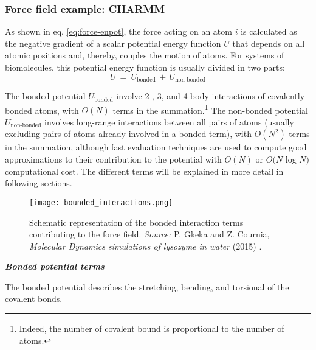 \subsubsection{Force field example: CHARMM}

As shown in eq. \eqref{eq:force-enpot}, the force acting on an atom $i$ is calculated as the negative gradient of a scalar potential energy function $U$ that depends on all atomic positions and, thereby, couples the motion of atoms. For systems of biomolecules, this potential energy function is usually divided in two parts:
\begin{equation}\label{eq:forcefield-PotEnergy}
U \: = \: U_{\text{bonded}} \, + \, U_{\text{non-bonded}} 
\end{equation}

The bonded potential $U_{\text{bonded}}$ involve 2 , 3, and 4-body interactions of covalently bonded atoms, with $O(N)$ terms in the summation.\footnote{Indeed, the number of covalent bound is proportional to the number of atoms.}
The non-bonded potential $U_{\text{non-bonded}}$ involves long-range interactions between all pairs of atoms (usually excluding pairs of atoms already involved in a bonded term), with $O(N^2)$ terms in the summation, although fast evaluation techniques are used to compute good approximations to their contribution to the potential with $O(N)$ or $O(N$ log $N )$ computational cost. The different terms will be explained in more detail in following sections.

\begin{figure}[H]
\centering
\begin{minipage}[t]{0.725\textwidth}
	\centering
    \texttt{[image: bounded\_interactions.png]}
    
    \footnotesize{\caption{Schematic representation of the bonded interaction terms contributing to the force field.
    \textit{Source:} P. Gkeka and Z. Cournia, \textit{Molecular Dynamics simulations of lysozyme in water} (2015) 
    \cite{ref:MDsim_Gkeka}.}
    \label{fig:bounded_int}
    }
\end{minipage} 
\end{figure}

\begin{center}
{\textbf{\textit{Bonded potential terms}}}
\end{center}
The bonded potential describes the stretching, bending, and torsional of the covalent bonds. 



